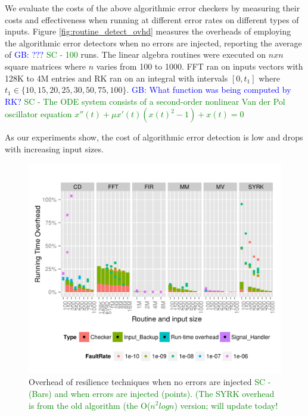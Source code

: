 \documentclass{sig-alternate}
\newcommand{\sui}[1]{%
  \textcolor{green}{SC - #1}
}
\newcommand{\greg}[1]{%
  \textcolor{blue}{GB: #1}
}
\begin{document}
We evaluate the costs of the above algorithmic error checkers by measuring their costs and effectiveness when running at different error rates on different types of inputs.
Figure \ref{fig:routine_detect_ovhd} measures the overheads of employing the algorithmic error detectors when no errors are injected, reporting the average of \greg{???} \sui{100} runs.
The linear algebra routines were executed on $nxn$ square matrices where $n$ varies from 100 to 1000.
FFT ran on inputs vectors with 128K to 4M entries and RK ran on an integral with intervals $[0, t_1]$ where $t_1 \in \{10, 15, 20, 25, 30, 50, 75, 100\}$. \greg{What function was being computed by RK?} \sui{The ODE system consists of a second-order nonlinear Van der Pol oscillator equation $x''(t)+\mu x'(t)(x(t)^2-1)+x(t)=0$}
As our experiments show, the cost of algorithmic error detection is low and drops with increasing input sizes.

\begin{figure}[ht!]
\centering
\includegraphics[width=1.00\columnwidth]{figs/4_1_1_Overall_Breakdown.png}
\caption{Overhead of resilience techniques when no errors are injected \sui{(Bars) and when errors are injected (points). (The SYRK overhead is from the old algorithm (the O($n^2 logn$) version; will update today! }}
\label{fig:routine_all_ovhd}
\end{figure}
\end{document}
